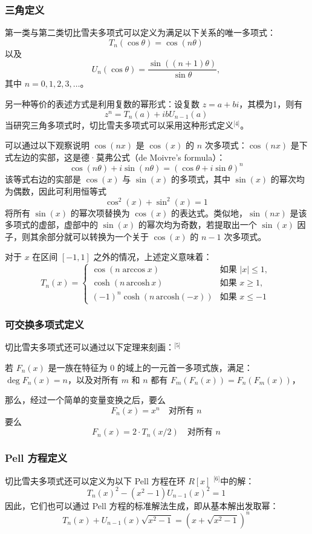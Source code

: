 \subsubsection{三角定义}
第一类与第二类切比雪夫多项式可以定义为满足以下关系的唯一多项式：
$$
T_n(\cos \theta) = \cos(n\theta)~
$$
以及
$$
U_n(\cos \theta) = \frac{\sin((n+1)\theta)}{\sin \theta},~
$$
其中 $n = 0, 1, 2, 3, \ldots$。

另一种等价的表述方式是利用复数的幂形式：设复数 $z = a + bi$，其模为1，则有
$$
z^n = T_n(a) + i b U_{n-1}(a)~
$$
当研究三角多项式时，切比雪夫多项式可以采用这种形式定义\(^\text{[4]}\)。

可以通过以下观察说明 $\cos(nx)$ 是 $\cos(x)$ 的 $n$ 次多项式：$\cos(nx)$ 是下式左边的实部，这是德·莫弗公式（de Moivre’s formula）：
$$
\cos(n\theta) + i\sin(n\theta) = (\cos \theta + i \sin \theta)^n~
$$
该等式右边的实部是 $\cos(x)$ 与 $\sin(x)$ 的多项式，其中 $\sin(x)$ 的幂次均为偶数，因此可利用恒等式
$$
\cos^2(x) + \sin^2(x) = 1~
$$
将所有 $\sin(x)$ 的幂次项替换为 $\cos(x)$ 的表达式。类似地，$\sin(nx)$ 是该多项式的虚部，虚部中的 $\sin(x)$ 的幂次均为奇数，若提取出一个 $\sin(x)$ 因子，则其余部分就可以转换为一个关于 $\cos(x)$ 的 $n-1$ 次多项式。

对于 $x$ 在区间 $[-1, 1]$ 之外的情况，上述定义意味着：
$$
T_n(x) =
\begin{cases}
\cos(n \arccos x) & \text{如果 } |x| \leq 1, \\
\cosh(n \, \mathrm{arcosh}\, x) & \text{如果 } x \geq 1, \\
(-1)^n \cosh(n \, \mathrm{arcosh}(-x)) & \text{如果 } x \leq -1
\end{cases}~
$$
\subsubsection{可交换多项式定义}
切比雪夫多项式还可以通过以下定理来刻画：\(^\text{[5]}\)

若 $F_n(x)$ 是一族在特征为 0 的域上的一元首一多项式族，满足：$\deg F_n(x) = n$，以及对所有 $m$ 和 $n$ 都有 $F_m(F_n(x)) = F_n(F_m(x))$，

那么，经过一个简单的变量变换之后，要么
$$
F_n(x) = x^n \quad \text{对所有 } n~
$$
要么
$$
F_n(x) = 2 \cdot T_n(x/2) \quad \text{对所有 } n~
$$
\subsubsection{Pell 方程定义}
切比雪夫多项式还可以定义为以下 Pell 方程在环 $R[x]$ \(^\text{[6]}\)中的解：
$$
T_n(x)^2 - (x^2 - 1) U_{n-1}(x)^2 = 1~
$$
因此，它们也可以通过 Pell 方程的标准解法生成，即从基本解出发取幂：
$$
T_n(x) + U_{n-1}(x) \sqrt{x^2 - 1} = \left(x + \sqrt{x^2 - 1}\right)^n~
$$

